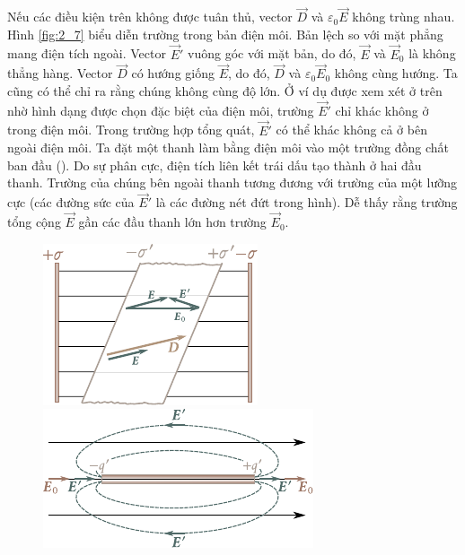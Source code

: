 Nếu các điều kiện trên không được tuân thủ, vector $\vec{D}$ và $\varepsilon_0\vec{E}$ không trùng nhau. Hình \ref{fig:2_7} biểu diễn trường trong bản điện môi. Bản lệch so với mặt phẳng mang điện tích ngoài. Vector $\vec{E}'$ vuông góc với mặt bản, do đó, $\vec{E}$ và $\vec{E}_0$ là không thẳng hàng. Vector $\vec{D}$ có hướng giống $\vec{E}$, do đó, $\vec{D}$ và $\varepsilon_0\vec{E}_0$ không cùng hướng. Ta cũng có thể chỉ ra rằng chúng không cùng độ lớn.
Ở ví dụ được xem xét ở trên nhờ hình dạng được chọn đặc biệt của điện môi, trường $\vec{E}'$ chỉ khác không ở trong điện môi. Trong trường hợp tổng quát, $\vec{E}'$ có thể khác không cả ở bên ngoài điện môi. Ta đặt một thanh làm bằng điện môi vào một trường đồng chất ban đầu (). Do sự phân cực, điện tích liên kết trái dấu tạo thành ở hai đầu thanh. Trường của chúng bên ngoài thanh tương đương với trường của một lưỡng cực (các đường sức của $\vec{E}'$ là các đường nét đứt trong hình). Dễ thấy rằng trường tổng cộng $\vec{E}$ gần các đầu thanh lớn hơn trường $\vec{E}_0$.

\begin{figure}[!htb]
	\begin{minipage}[t]{0.46\linewidth}
		\begin{center}
			\includegraphics[scale=1.2]{figures/ch_02/fig_2_7.pdf}
			\caption[]{}
			\label{fig:2_7}
		\end{center}
	\end{minipage}
	\hfill{}%
	\begin{minipage}[t]{0.5\linewidth}
		\begin{center}
			\includegraphics[scale=1.2]{figures/ch_02/fig_2_8.pdf}
			\caption[]{}
			\label{fig:2_8}
		\end{center}
	\end{minipage}
\vspace{-0.4cm}
\end{figure}

